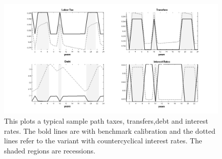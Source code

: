 \documentclass[thmsb,11pt]{article}
\begin{document}
%
%
\smallskip

\begin{figure}[htp]
\includegraphics[width=\textwidth]{Draft25Graphs/DiscoutFactorComparison.png}
\caption{This plots a typical sample path taxes, transfers,debt and interest rates. The bold lines are with  benchmark calibration and the dotted lines refer to the variant with countercyclical interest rates. The shaded regions are recessions.}
\label{fig:DiscoutFactorComparison}
\end{figure}
\end{document}

